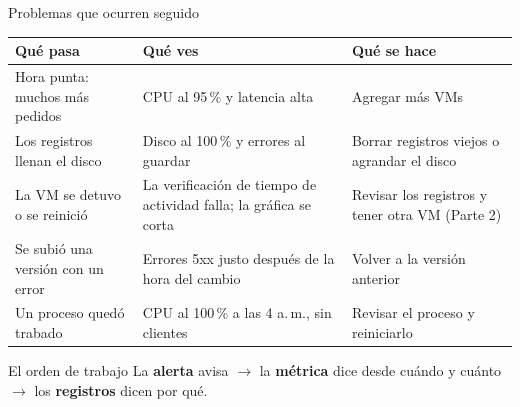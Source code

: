 \documentclass[aspectratio=169,10pt,c]{beamer}
\begin{document}
\begin{frame}{Problemas que ocurren seguido}
\renewcommand{\arraystretch}{1.3}
\centering\small
\begin{tabular}{@{}>{\raggedright\arraybackslash}p{3.7cm}>{\raggedright\arraybackslash}p{4.4cm}>{\raggedright\arraybackslash}p{4.6cm}@{}}
\toprule
\textbf{Qué pasa} & \textbf{Qué ves} & \textbf{Qué se hace}\\
\midrule
Hora punta: muchos más pedidos & CPU al 95\,\% y latencia alta & Agregar más VMs\\
Los registros llenan el disco & Disco al 100\,\% y errores al guardar & Borrar registros viejos o agrandar el disco\\
La VM se detuvo o se reinició & La verificación de tiempo de actividad falla; la gráfica se corta & Revisar los registros y tener otra VM (Parte 2)\\
Se subió una versión con un error & Errores 5xx justo después de la hora del cambio & Volver a la versión anterior\\
Un proceso quedó trabado & CPU al 100\,\% a las 4 a.\,m., sin clientes & Revisar el proceso y reiniciarlo\\
\bottomrule
\end{tabular}
\par\vspace{3mm}
\begin{alertblock}{El orden de trabajo}
\small La \textbf{alerta} avisa $\rightarrow$ la \textbf{métrica} dice desde cuándo y cuánto $\rightarrow$ los \textbf{registros} dicen por qué.
\end{alertblock}
\end{frame}
\end{document}
